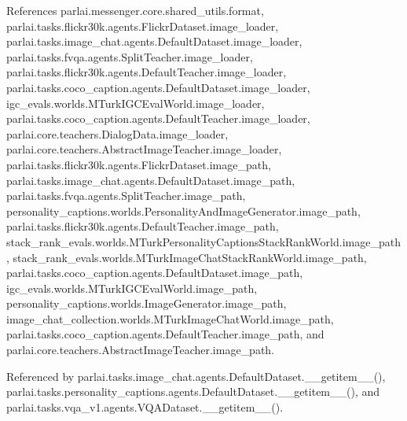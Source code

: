 References parlai.\+messenger.\+core.\+shared\+\_\+utils.\+format, parlai.\+tasks.\+flickr30k.\+agents.\+Flickr\+Dataset.\+image\+\_\+loader, parlai.\+tasks.\+image\+\_\+chat.\+agents.\+Default\+Dataset.\+image\+\_\+loader, parlai.\+tasks.\+fvqa.\+agents.\+Split\+Teacher.\+image\+\_\+loader, parlai.\+tasks.\+flickr30k.\+agents.\+Default\+Teacher.\+image\+\_\+loader, parlai.\+tasks.\+coco\+\_\+caption.\+agents.\+Default\+Dataset.\+image\+\_\+loader, igc\+\_\+evals.\+worlds.\+M\+Turk\+I\+G\+C\+Eval\+World.\+image\+\_\+loader, parlai.\+tasks.\+coco\+\_\+caption.\+agents.\+Default\+Teacher.\+image\+\_\+loader, parlai.\+core.\+teachers.\+Dialog\+Data.\+image\+\_\+loader, parlai.\+core.\+teachers.\+Abstract\+Image\+Teacher.\+image\+\_\+loader, parlai.\+tasks.\+flickr30k.\+agents.\+Flickr\+Dataset.\+image\+\_\+path, parlai.\+tasks.\+image\+\_\+chat.\+agents.\+Default\+Dataset.\+image\+\_\+path, parlai.\+tasks.\+fvqa.\+agents.\+Split\+Teacher.\+image\+\_\+path, personality\+\_\+captions.\+worlds.\+Personality\+And\+Image\+Generator.\+image\+\_\+path, parlai.\+tasks.\+flickr30k.\+agents.\+Default\+Teacher.\+image\+\_\+path, stack\+\_\+rank\+\_\+evals.\+worlds.\+M\+Turk\+Personality\+Captions\+Stack\+Rank\+World.\+image\+\_\+path, stack\+\_\+rank\+\_\+evals.\+worlds.\+M\+Turk\+Image\+Chat\+Stack\+Rank\+World.\+image\+\_\+path, parlai.\+tasks.\+coco\+\_\+caption.\+agents.\+Default\+Dataset.\+image\+\_\+path, igc\+\_\+evals.\+worlds.\+M\+Turk\+I\+G\+C\+Eval\+World.\+image\+\_\+path, personality\+\_\+captions.\+worlds.\+Image\+Generator.\+image\+\_\+path, image\+\_\+chat\+\_\+collection.\+worlds.\+M\+Turk\+Image\+Chat\+World.\+image\+\_\+path, parlai.\+tasks.\+coco\+\_\+caption.\+agents.\+Default\+Teacher.\+image\+\_\+path, and parlai.\+core.\+teachers.\+Abstract\+Image\+Teacher.\+image\+\_\+path.



Referenced by parlai.\+tasks.\+image\+\_\+chat.\+agents.\+Default\+Dataset.\+\_\+\+\_\+getitem\+\_\+\+\_\+(), parlai.\+tasks.\+personality\+\_\+captions.\+agents.\+Default\+Dataset.\+\_\+\+\_\+getitem\+\_\+\+\_\+(), and parlai.\+tasks.\+vqa\+\_\+v1.\+agents.\+V\+Q\+A\+Dataset.\+\_\+\+\_\+getitem\+\_\+\+\_\+().

